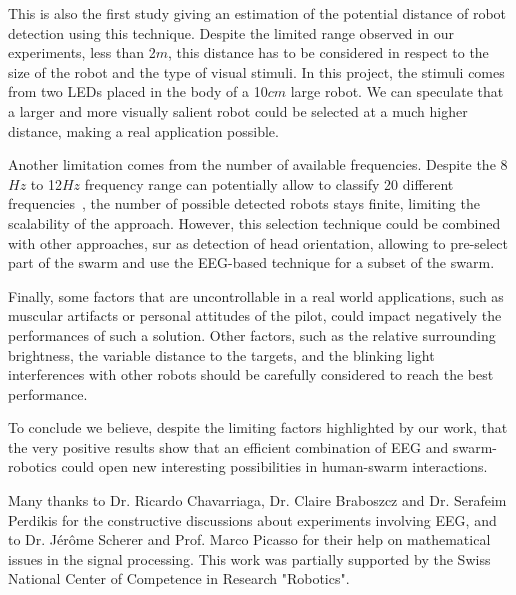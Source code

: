 \documentclass{svmult}
\begin{document}
This is also the first study giving an estimation of the potential distance of robot detection using this technique.
Despite the limited range observed in our experiments, less than 2$m$, this distance has to be considered in respect to the size of the robot and the type of visual stimuli.
In this project, the stimuli comes from two LEDs placed in the body of a 10$cm$ large robot. 
We can speculate that a larger and more visually salient robot could be selected at a much higher distance, making a real application possible.


Another limitation comes from the number of available frequencies.
Despite the 8$Hz$ to 12$Hz$ frequency range can potentially allow to classify 20 different frequencies~\cite{SSVEPfiability}, the number of possible detected robots stays finite, limiting the scalability of the approach. 
However, this selection technique could be combined with other approaches, sur as detection of head orientation, allowing to pre-select part of the swarm and use the EEG-based technique for a subset of the swarm.


Finally, some factors that are uncontrollable in a real world applications, such as muscular artifacts or personal attitudes of the pilot, could impact negatively the performances of such a solution.
Other factors, such as the relative surrounding brightness, the variable distance to the targets, and the blinking light interferences with other robots should be carefully considered to reach the best performance.


To conclude we believe, despite the limiting factors highlighted by our work, that the very positive results show that an efficient combination of EEG and swarm-robotics could open new interesting possibilities in human-swarm interactions.\\


\begin{acknowledgement}
Many thanks to Dr. Ricardo Chavarriaga, Dr. Claire Braboszcz and Dr. Serafeim Perdikis for the constructive discussions about experiments involving EEG, and to Dr. J\'er\^ome Scherer and Prof. Marco Picasso for their help on mathematical issues in the signal processing. This work was partially supported by the Swiss National Center of Competence in Research "Robotics".
\end{acknowledgement}


\end{document}
